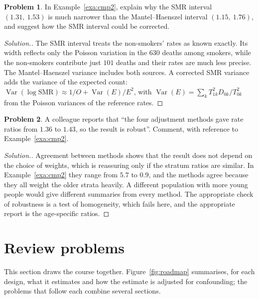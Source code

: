 \documentclass[11pt,a4paper]{article}
\numberwithin{equation}{section}
\DeclareMathOperator{\Var}{Var}
\theoremstyle{definition}
\newtheorem{problemx}{Problem}[subsection]
\newenvironment{problem}{\begin{problemx}}{\end{problemx}}
\newenvironment{solution}
  {\renewcommand{\qedsymbol}{}\begin{proof}[\textit{Solution}.]}
  {\end{proof}}
\begin{document}
\begin{problem}
In Example~\ref{exa:cmp2}, explain why the SMR interval $(1.31,\ 1.53)$ is much narrower than the Mantel--Haenszel interval $(1.15,\ 1.76)$, and
suggest how the SMR interval could be corrected.
\end{problem}

\begin{solution}
The SMR interval treats the non-smokers' rates as known exactly. Its width reflects only the Poisson variation in the $630$ deaths among
smokers, while the non-smokers contribute just $101$ deaths and their rates are much less precise. The Mantel--Haenszel variance includes both
sources. A corrected SMR variance adds the variance of the expected count: $\Var(\log\text{SMR}) \approx 1/O + \Var(E)/E^2$, with
$\Var(E) = \sum_k T_{1k}^2 D_{0k}/T_{0k}^2$ from the Poisson variances of the reference rates.
\end{solution}

\begin{problem}
A colleague reports that ``the four adjustment methods gave rate ratios from $1.36$ to $1.43$, so the result is robust''. Comment, with
reference to Example~\ref{exa:cmp2}.
\end{problem}

\begin{solution}
Agreement between methods shows that the result does not depend on the choice of weights, which is reassuring only if the stratum
ratios are similar. In Example~\ref{exa:cmp2} they range from $5.7$ to $0.9$, and the methods agree because they all weight the older strata
heavily. A different population with more young people would give different summaries from every method. The appropriate check of
robustness is a test of homogeneity, which fails here, and the appropriate report is the age-specific ratios.
\end{solution}

\section{Review problems}
\label{sec:review}

This section draws the course together. Figure~\ref{fig:roadmap} summarises, for each design, what it estimates and how the
estimate is adjusted for confounding; the problems that follow each combine several sections.
\end{document}
